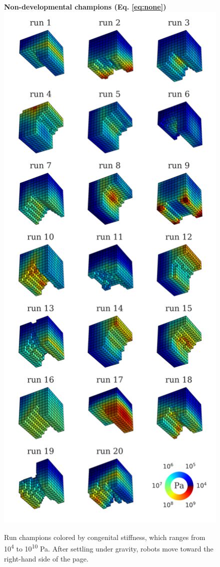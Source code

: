 \begin{figure}%
\centering
{\Large \textbf{Non-developmental champions (Eq. \ref{eq:none})}}
\includegraphics[width=0.5\linewidth]{Chapter06/img/zero_run_champs}
\caption{\label{fig:none} Run champions colored by congenital stiffness, which ranges from 10\textsuperscript{4} to 10\textsuperscript{10} Pa. After settling under gravity, robots move toward the right-hand side of the page.}
\end{figure}


